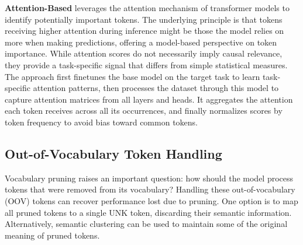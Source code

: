 \documentclass[twocolumn]{article}
\begin{document}

\textbf{Attention-Based}
leverages the attention mechanism of transformer models to identify potentially important tokens. The underlying principle is that tokens receiving higher attention during inference might be those the model relies on more when making predictions, offering a model-based perspective on token importance\cite{guo2024attention}. While attention scores do not necessarily imply causal relevance, they provide a task-specific signal that differs from simple statistical measures. The approach first finetunes the base model on the target task to learn task-specific attention patterns, then processes the dataset through this model to capture attention matrices from all layers and heads. It aggregates the attention each token receives across all its occurrences, and finally normalizes scores by token frequency to avoid bias toward common tokens.


\subsection{Out-of-Vocabulary Token Handling}
Vocabulary pruning raises an important question: how should the model process tokens that were removed from its vocabulary? Handling these out-of-vocabulary (OOV) tokens can recover performance lost due to pruning.
One option is to map all pruned tokens to a single UNK token, discarding their semantic information.
Alternatively, semantic clustering can be used to maintain some of the original meaning of pruned tokens.
\end{document}
